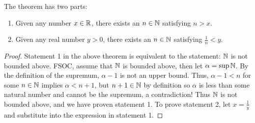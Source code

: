\begin{theorem}
	The theorem has two parts:
	\begin{enumerate}
		\item Given any number $x \in \mathbb{R}$, there exists an $n \in \mathbb{N}$ satisfying $n > x$.
		\item Given any real number  $y>0$, there exists an $n \in \mathbb{N}$ satisfying $\frac{1}{n} < y$.
	\end{enumerate}
\end{theorem}

\begin{proof}
	Statement 1 in the above theorem is equivalent to the statement: $\mathbb{N}$ is not bounded above. FSOC, assume that $\mathbb{N}$ is bounded above, then let $\alpha = \sup \mathbb{N}$. By the definition of the supremum, $\alpha - 1$ is not an upper bound. Thus, $\alpha - 1 < n$ for some $n \in \mathbb{N}$ implies $\alpha < n + 1$, but $n+1 \in \mathbb{N}$ by definition so $\alpha$ is less than some natural number and cannot be the supremum, a contradiction! Thus $\mathbb{N}$ is not bounded above, and we have proven statement 1. To prove statement 2, let $x = \frac{1}{y}$ and substitute into the expression in statement 1.
\end{proof}



